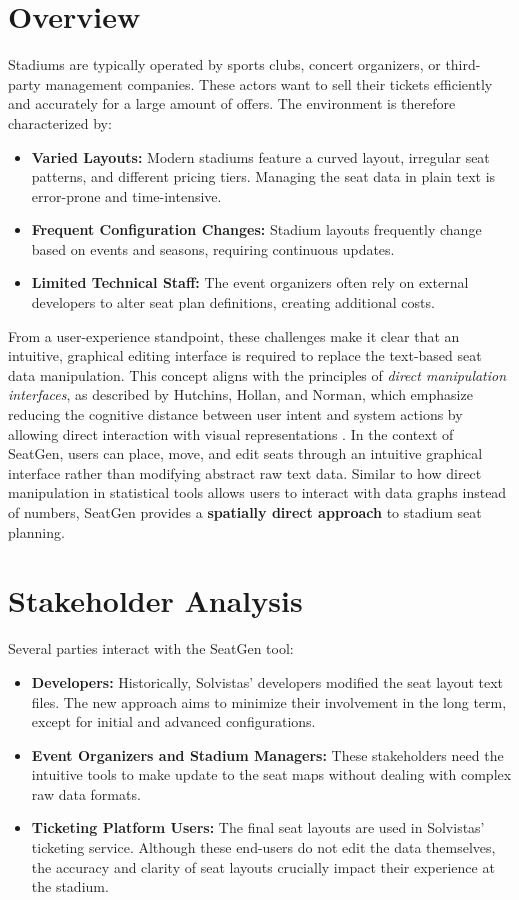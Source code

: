 \section{Overview}
Stadiums are typically operated by sports clubs, concert organizers, or third-party management companies. These actors want to sell their tickets efficiently and accurately for a large amount of offers. The environment is therefore characterized by:
\begin{itemize}
    \item \textbf{Varied Layouts:} Modern stadiums feature a curved layout, irregular seat patterns, and different pricing tiers. Managing the seat data in plain text is error-prone and time-intensive.
    \item \textbf{Frequent Configuration Changes:} Stadium layouts frequently change based on events and seasons, requiring continuous updates.
    \item \textbf{Limited Technical Staff:} The event organizers often rely on external developers to alter seat plan definitions, creating additional costs.
\end{itemize}

From a user-experience standpoint, these challenges make it clear that an intuitive, graphical editing interface is required to replace the text-based seat data manipulation. This concept aligns with the principles of \emph{direct manipulation interfaces}, as described by Hutchins, Hollan, and Norman, which emphasize reducing the cognitive distance between user intent and system actions by allowing direct interaction with visual representations \cite{Hutchins01121985}. In the context of SeatGen, users can place, move, and edit seats through an intuitive graphical interface rather than modifying abstract raw text data. Similar to how direct manipulation in statistical tools allows users to interact with data graphs instead of numbers, SeatGen provides a \textbf{spatially direct approach} to stadium seat planning.

\section{Stakeholder Analysis}
Several parties interact with the SeatGen tool:
\begin{itemize}
    \item \textbf{Developers:} Historically, Solvistas' developers modified the seat layout text files. The new approach aims to minimize their involvement in the long term, except for initial and advanced configurations.
    \item \textbf{Event Organizers and Stadium Managers:} These stakeholders need the intuitive tools to make update to the seat maps without dealing with complex raw data formats.
    \item \textbf{Ticketing Platform Users:} The final seat layouts are used in Solvistas' ticketing service. Although these end-users do not edit the data themselves, the accuracy and clarity of seat layouts crucially impact their experience at the stadium.
\end{itemize}


